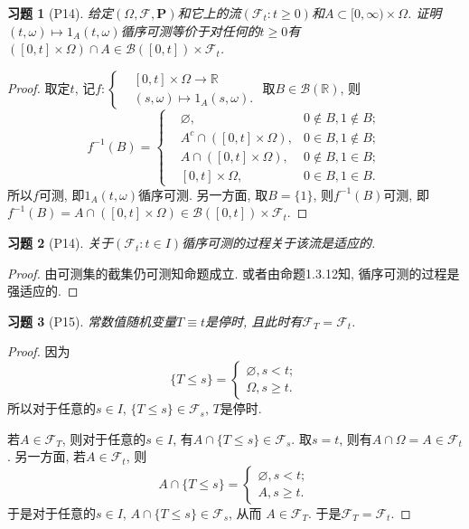 \documentclass[UTF8,ondside]{ctexart}
\newtheorem{exercise}{习题}[section]
\newcommand{\h}{\mathscr}
\newcommand{\kx}{\mathbb}
\newcommand{\mbf}{\mathbf}
\numberwithin{equation}{section}
\begin{document}
	\begin{exercise}[P14]
		给定$(\Omega,\h F,\mbf P)$和它上的流$(\h F_t:t\geq 0)$和$A\subset [0,\infty)\times\Omega$. 证明$(t,\omega)\mapsto 1_A(t,\omega)$循序可测等价于对任何的$t\geq 0$有 $([0,t]\times\Omega)\cap A\in\h B([0,t])\times\h F_t$.
	\end{exercise}
	\begin{proof}
		取定$t$, 记$f:\left\{
			\begin{aligned}
				& [0,t]\times\Omega \rightarrow \kx R\\
				& (s,\omega)\mapsto 1_A(s,\omega).
			\end{aligned}
			\right. $ 
			取$B\in\h B(\kx R)$, 则
			\[
				f^{-1}(B)=\left\{
					\begin{aligned}
					& \varnothing, & 0\notin B,1\notin B;\\
					& A^c\cap ([0,t]\times\Omega),&0\in B,1\notin B;\\
					& A\cap ([0,t]\times\Omega),&0\notin B,1\in B;\\
					& [0,t]\times\Omega, &0\in B,1\in B.
					\end{aligned}
				\right.
			\]
			所以$f$可测, 即$1_A(t,\omega)$循序可测. 另一方面, 取$B=\{1\}$, 则$f^{-1}(B)$可测, 即$f^{-1}(B)=A\cap ([0,t]\times\Omega)\in \h B([0,t])\times\h F_t$.
	\end{proof}
	\begin{exercise}[P14]
		关于$(\h F_t:t\in I)$循序可测的过程关于该流是适应的.
	\end{exercise}
	\begin{proof}
		由可测集的截集仍可测知命题成立. 或者由命题1.3.12知, 循序可测的过程是强适应的. 
	\end{proof}
	\begin{exercise}[P15]
		常数值随机变量$T\equiv t$是停时, 且此时有$\h F_T=\h F_t$.
	\end{exercise}
	\begin{proof}
		因为
		\[
			\{T\leq s\}=\left\{
				\begin{aligned}
					\varnothing, s< t;\\
					\Omega, s\geq t.
				\end{aligned}
			\right.
		\]
		所以对于任意的$s\in I$, $\{T\leq s\}\in \h F_s$, $T$是停时. 

		若$A\in\h F_T$, 则对于任意的$s\in I$, 有$A\cap\{T\leq s\}\in\h F_s$. 取$s=t$, 则有$A\cap \Omega=A\in \h F_t$. 另一方面, 若$A\in \h F_t$, 则
		\[
			A\cap\{T\leq s\}=\left\{
				\begin{aligned}
					\varnothing, s<t;\\
					A, s\geq t.
				\end{aligned}
			\right.
		\]
		于是对于任意的$s\in I$, $A\cap\{T\leq s\}\in\h F_s$, 从而 $A\in\h F_T$. 于是$\h F_T=\h F_t$.
	\end{proof}
\end{document}
